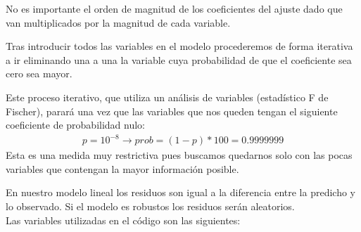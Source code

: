 \documentclass[12pt]{article}
\begin{document}
No es importante el orden de magnitud de  los coeficientes del ajuste dado que van multiplicados por la magnitud de cada variable.


Tras introducir todos las variables en el modelo procederemos de forma iterativa a ir eliminando una a una la variable cuya probabilidad de que el coeficiente sea cero sea mayor. 

Este proceso iterativo, que utiliza un análisis de variables (estadístico F de Fischer), parará una vez que las variables que nos queden tengan  el siguiente coeficiente de probabilidad nulo:
\begin{eqnarray}
p=10^{-8} \rightarrow prob=(1-p)*100=0.9999999
\end{eqnarray}
Esta es una medida muy restrictiva pues buscamos quedarnos solo con las pocas variables que contengan la mayor información posible.

En nuestro modelo lineal los residuos son igual a la diferencia entre la predicho  y lo observado. Si el modelo es robustos los residuos serán aleatorios.\\


Las variables utilizadas en el código son las siguientes:
\end{document}
